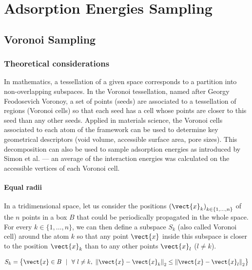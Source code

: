 \documentclass[main]{subfiles}
\begin{document}
\chapter{Adsorption Energies Sampling}
\vspace*{-1\baselineskip}


\section{Voronoi Sampling}

\subsection{Theoretical considerations}

In mathematics, a tessellation of a given space corresponds to a partition into non-overlapping subspaces. In the Voronoi tessellation, named after Georgy Feodosevich Voronoy, a set of points (seeds) are associated to a tessellation of regions (Voronoi cells) so that each seed has a cell whose points are closer to this seed than any other seeds.\autocite{Rycroft_2009} Applied in materials science, the Voronoi cells associated to each atom of the framework can be used to determine key geometrical descriptors (void volume, accessible surface area, pore sizes). This decomposition can also be used to sample adsorption energies as introduced by Simon et al. --- an average of the interaction energies was calculated on the accessible vertices of each Voronoi cell.\autocite{Simon_2015}

\subsubsection{Equal radii}

In a tridimensional space, let us consider the positions ${(\vect{x}_k)}_{k\in\{1,\ldots,n\}}$ of the $n$ points in a box $B$ that could be periodically propagated in the whole space. For every $k\in\{1,\ldots,n\}$, we can then define a subspace $S_{k}$ (also called Voronoi cell) around the atom $k$ so that any point $\vect{x}$ inside this subspace is closer to the position $\vect{x}_k$ than to any other points $\vect{x}_l$ ($l\neq k$). 

\begin{equation}\label{eq:voronoi_partition}
  S_{k} = \left\{\vect{x} \in B\ \ |\ \ \forall\ l\neq k,\ {\lVert \vect{x}-\vect{x}_k \rVert}_2 \leq {\lVert \vect{x}-\vect{x}_l \rVert}_2 \right\}
\end{equation}
\end{document}
